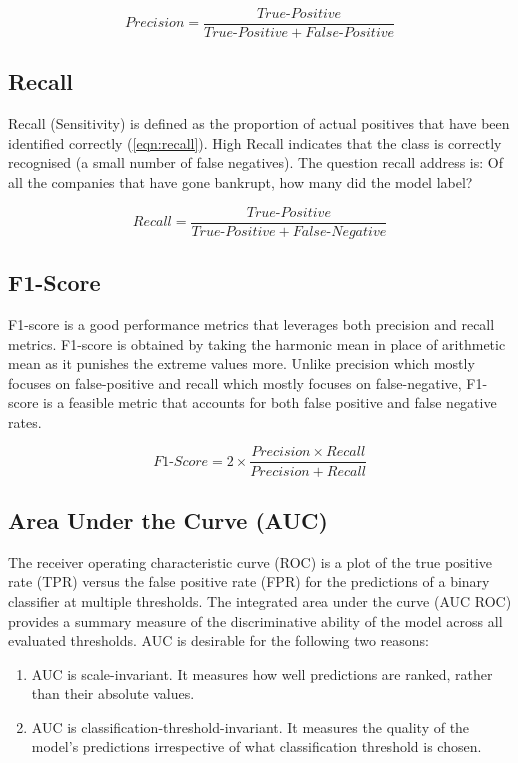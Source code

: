 \begin{equation}
\label{eqn:precision}
    Precision = \frac{True\mbox{-}Positive }{True\mbox{-}Positive + False\mbox{-}Positive}
\end{equation}

\subsection{Recall}
Recall (Sensitivity) is defined as the proportion of actual positives that have been identified correctly (\autoref{eqn:recall}). High Recall indicates that the class is correctly recognised (a small number of false negatives).
The question recall address is: Of all the companies that have gone bankrupt, how many did the model label? 


\begin{equation}
\label{eqn:recall}
    Recall = \frac{True\mbox{-}Positive }{True\mbox{-}Positive + False\mbox{-}Negative}
\end{equation}

\subsection{F1-Score}
F1-score is a good performance metrics that leverages both precision and recall metrics. F1-score is obtained by taking the harmonic mean in place of arithmetic mean as it punishes the extreme values more.
Unlike precision which mostly focuses on false-positive and recall which mostly focuses on false-negative, F1-score is a feasible metric that accounts for both false positive and false negative rates. 

\begin{equation}
\label{eqn:recall}
    F1\mbox{-}Score = 2 \times \frac{Precision \times Recall}{Precision + Recall}
\end{equation}

\subsection{Area Under the Curve (AUC)}
The receiver operating characteristic curve (ROC) is a plot of the true positive rate (TPR) versus the false positive rate (FPR) for the predictions of a binary classifier at multiple thresholds. The integrated area under the curve (AUC ROC) provides a summary measure of the discriminative ability of the model across all evaluated thresholds. AUC is desirable for the following two reasons:
\begin{enumerate}
    \item AUC is scale-invariant. It measures how well predictions are ranked, rather than their absolute values.
    \item AUC is classification-threshold-invariant. It measures the quality of the model's predictions irrespective of what classification threshold is chosen.
\end{enumerate}

